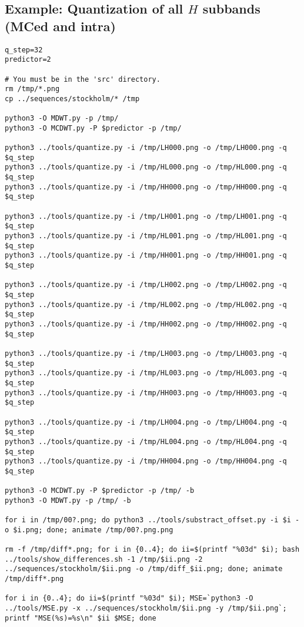 \subsection*{Example: Quantization of all $H$ subbands (MCed and intra)}
\begin{verbatim}
q_step=32
predictor=2

# You must be in the 'src' directory.
rm /tmp/*.png
cp ../sequences/stockholm/* /tmp

python3 -O MDWT.py -p /tmp/
python3 -O MCDWT.py -P $predictor -p /tmp/

python3 ../tools/quantize.py -i /tmp/LH000.png -o /tmp/LH000.png -q $q_step
python3 ../tools/quantize.py -i /tmp/HL000.png -o /tmp/HL000.png -q $q_step
python3 ../tools/quantize.py -i /tmp/HH000.png -o /tmp/HH000.png -q $q_step

python3 ../tools/quantize.py -i /tmp/LH001.png -o /tmp/LH001.png -q $q_step
python3 ../tools/quantize.py -i /tmp/HL001.png -o /tmp/HL001.png -q $q_step
python3 ../tools/quantize.py -i /tmp/HH001.png -o /tmp/HH001.png -q $q_step

python3 ../tools/quantize.py -i /tmp/LH002.png -o /tmp/LH002.png -q $q_step
python3 ../tools/quantize.py -i /tmp/HL002.png -o /tmp/HL002.png -q $q_step
python3 ../tools/quantize.py -i /tmp/HH002.png -o /tmp/HH002.png -q $q_step

python3 ../tools/quantize.py -i /tmp/LH003.png -o /tmp/LH003.png -q $q_step
python3 ../tools/quantize.py -i /tmp/HL003.png -o /tmp/HL003.png -q $q_step
python3 ../tools/quantize.py -i /tmp/HH003.png -o /tmp/HH003.png -q $q_step

python3 ../tools/quantize.py -i /tmp/LH004.png -o /tmp/LH004.png -q $q_step
python3 ../tools/quantize.py -i /tmp/HL004.png -o /tmp/HL004.png -q $q_step
python3 ../tools/quantize.py -i /tmp/HH004.png -o /tmp/HH004.png -q $q_step

python3 -O MCDWT.py -P $predictor -p /tmp/ -b
python3 -O MDWT.py -p /tmp/ -b

for i in /tmp/00?.png; do python3 ../tools/substract_offset.py -i $i -o $i.png; done; animate /tmp/00?.png.png

rm -f /tmp/diff*.png; for i in {0..4}; do ii=$(printf "%03d" $i); bash ../tools/show_differences.sh -1 /tmp/$ii.png -2 ../sequences/stockholm/$ii.png -o /tmp/diff_$ii.png; done; animate /tmp/diff*.png

for i in {0..4}; do ii=$(printf "%03d" $i); MSE=`python3 -O ../tools/MSE.py -x ../sequences/stockholm/$ii.png -y /tmp/$ii.png`; printf "MSE(%s)=%s\n" $ii $MSE; done
\end{verbatim}

